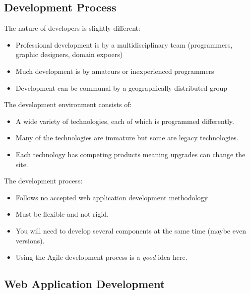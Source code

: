 \subsection{Development Process}\label{sub:development_process_was}

The nature of developers is slightly different:
\begin{itemize}
	\item Professional development is by a multidisciplinary team (programmers,  graphic designers, domain expoers)
	\item Much development is by amateurs or inexperienced programmers
	\item Development can be communal by a geographically distributed group
\end{itemize}
The development environment consists of:
\begin{itemize}
	\item A wide variety of technologies, each of which is programmed differently.
	\item Many of the technologies are immature but some are legacy technologies.
	\item Each technology has competing products meaning upgrades can change the site.
\end{itemize}
The development process:
\begin{itemize}
	\item Follows no accepted web application development methodology
	\item Must be flexible and not rigid.
	\item You will need to develop several components at the same time (maybe even versions).
	\item Using the Agile development process is a \emph{good} idea here.
\end{itemize}

\subsection{Web Application Development}\label{sub:web_application_development}

